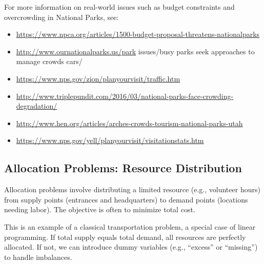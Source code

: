 \begin{resource}
For more information on real-world issues such as budget constraints and overcrowding in National Parks, see:
\begin{itemize}
\item \href{https://www.npca.org/articles/1500-budget-proposal-threatens-nationalparks}{https://www.npca.org/articles/1500-budget-proposal-threatens-nationalparks}
\item \href{http://www.ournationalparks.us/park}{http://www.ournationalparks.us/park} issues/busy parks seek approaches to manage crowds cars/ 
\item \href{https://www.nps.gov/zion/planyourvisit/traffic.htm}{https://www.nps.gov/zion/planyourvisit/traffic.htm}
\item \href{http://www.triplepundit.com/2016/03/national-parks-face-crowding-degradation/}{http://www.triplepundit.com/2016/03/national-parks-face-crowding-degradation/}
\item \href{http://www.hen.org/articles/arches-crowds-tourism-national-parks-utah}{http://www.hen.org/articles/arches-crowds-tourism-national-parks-utah}
\item \href{https://www.nps.gov/yell/planyourvisit/visitationstats.htm}{https://www.nps.gov/yell/planyourvisit/visitationstats.htm}
\end{itemize}
\end{resource}

\subsection{Allocation Problems: Resource Distribution}
Allocation problems involve distributing a limited resource (e.g., volunteer hours) from supply points (entrances and headquarters) to demand points (locations needing labor). The objective is often to minimize total cost.

This is an example of a classical transportation problem, a special case of linear programming. If total supply equals total demand, all resources are perfectly allocated. If not, we can introduce dummy variables (e.g., “excess” or “missing”) to handle imbalances.

